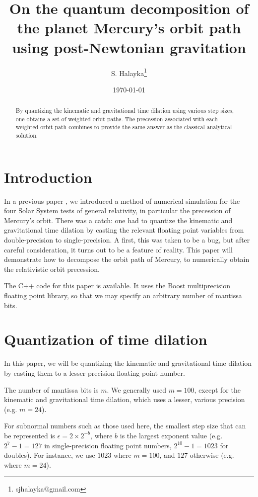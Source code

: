 \documentclass[12pt]{article}
\title{On the quantum decomposition of the planet Mercury's orbit path using post-Newtonian gravitation}
\author{S. Halayka\footnote{sjhalayka@gmail.com}}
\date{\today\;\currenttime}
\begin{document}
 
\maketitle

\begin{abstract}
By quantizing the kinematic and gravitational time dilation using various step sizes, one obtains a set of weighted orbit paths.
The precession associated with each weighted orbit path combines to provide the same answer as the classical analytical solution.
\end{abstract}





\section{Introduction}

In a previous paper \cite{halayka}, we introduced a method of numerical simulation for the four Solar System tests of general relativity, in particular the precession of Mercury's orbit.
There was a catch: one had to quantize the kinematic and gravitational time dilation by casting the relevant floating point variables from double-precision to single-precision.
A first, this was taken to be a bug, but after careful consideration, it turns out to be a feature of reality.
This paper will demonstrate how to decompose the orbit path of Mercury, to numerically obtain the relativistic orbit precession.

The C++ code for this paper is available.
It uses the Boost multiprecision floating point library, so that we may specify an arbitrary number of mantissa bits.


\section{Quantization of time dilation}

In this paper, we will be quantizing the kinematic and gravitational time dilation by casting them to a lesser-precision floating point number.

The number of mantissa bits is $m$.
We generally used $m = 100$, except for the kinematic and gravitational time dilation, which uses a lesser, various precision (e.g. $m = 24$).

For subnormal numbers such as those used here, the smallest step size that can be represented is $\epsilon = 2 \times 2^{-b}$, where $b$ is the largest exponent value (e.g. $2^7 - 1 = 127$ in single-precision floating point numbers, $2^{10} - 1 = 1023$ for doubles).
For instance, we use $1023$ where $m = 100$, and $127$ otherwise (e.g. where $m = 24$).
\end{document}
